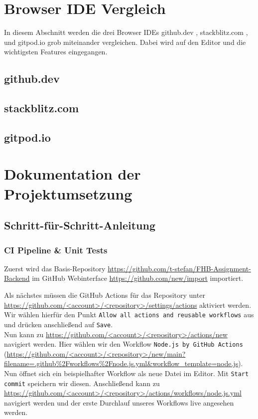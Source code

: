 \section{Browser IDE Vergleich}
In diesem Abschnitt werden die drei Browser IDEs
github.dev \cite{githubDevWebsite},
stackblitz.com \cite{stackblitzcomWebsite},
und
gitpod.io \cite{gitpodioWebsite}
grob miteinander vergleichen.
Dabei wird auf den Editor und die wichtigsten Features eingegangen.

\subsection{github.dev}

\subsection{stackblitz.com}

\subsection{gitpod.io}


\clearpage
\section{Dokumentation der Projektumsetzung}

\subsection{Schritt-für-Schritt-Anleitung}

\subsubsection{CI Pipeline \& Unit Tests}
Zuerst wird das Basis-Repository 
\url{https://github.com/t-stefan/FHB-Assignment-Backend}
im GitHub Webinterface
\url{https://github.com/new/import} 
importiert.

\noindent
Als nächstes müssen die GitHub Actions für das Repository unter
\url{https://github.com/<account>/<repository>/settings/actions}
aktiviert werden.
Wir wählen hierfür den Punkt \verb|Allow all actions and reusable workflows| aus
und drücken anschließend auf \verb|Save|. \\

\noindent
Nun kann zu \url{https://github.com/<account>/<repository>/actions/new}
navigiert werden.
Hier wählen wir den Workflow \verb|Node.js by GitHub Actions| 
(\url{https://github.com/<account>/<repository>/new/main?filename=.github%2Fworkflows%2Fnode.js.yml&workflow_template=node.js}).
Nun öffnet sich ein beispielhafter Workflow als neue Datei im Editor.
Mit \verb|Start commit| speichern wir diesen.
Anschließend kann zu \url{https://github.com/<account>/<repository>/actions/workflows/node.js.yml}
navigiert werden und der erste Durchlauf unseres Workflows live angesehen werden. \\

